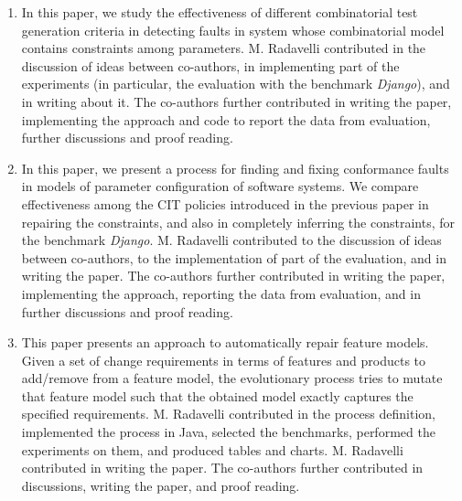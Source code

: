 \documentclass [a4paper, 12pt, twoside]{report}
\theoremstyle{plain}
\theoremstyle{definition}
\theoremstyle{remark}
\theoremstyle{plain}
\theoremstyle{plain}
\theoremstyle{remark}
\begin{document}
\begin{enumerate}
	\renewcommand{\theenumi}{\Alph{enumi}} %
	\item \cite{Gargantini16:validation} 
	
	In this paper, we study the effectiveness of different combinatorial test generation criteria in detecting faults in system whose combinatorial model contains constraints among parameters.
	M. Radavelli contributed in the discussion of ideas between co-authors, in implementing part of the experiments (in particular, the evaluation with the benchmark \textit{Django}), and in writing about it.
	The co-authors further contributed in writing the paper, implementing the approach and code to report the data from evaluation, further discussions and proof reading.

	\item \cite{gargantini_combinatorial_2017} 

	In this paper, we present a process for finding and fixing conformance faults in models of parameter configuration of software systems. We compare effectiveness among the CIT policies introduced in the previous paper \cite{Gargantini16:validation} in repairing the constraints, and also in completely inferring the constraints, for the benchmark \textit{Django}.
	M. Radavelli contributed to the discussion of ideas between co-authors, to the implementation of part of the evaluation, and in writing the paper.
	The co-authors further contributed in writing the paper, implementing the approach, reporting the data from evaluation, and in further discussions and proof reading.
		
	\item \cite{arcaini_evolutionary_2018} 
	
	This paper presents an approach to automatically repair feature models. Given a set of change requirements in terms of features and products to add/remove from a feature model, the evolutionary process tries to mutate that feature model such that the obtained model exactly captures the specified requirements.
	M. Radavelli contributed in the process definition, implemented the process in Java, selected the benchmarks, performed the experiments on them, and produced tables and charts. M. Radavelli contributed in writing the paper.
	The co-authors further contributed in discussions, writing the paper, and proof reading.


\end{enumerate}
\end{document}
